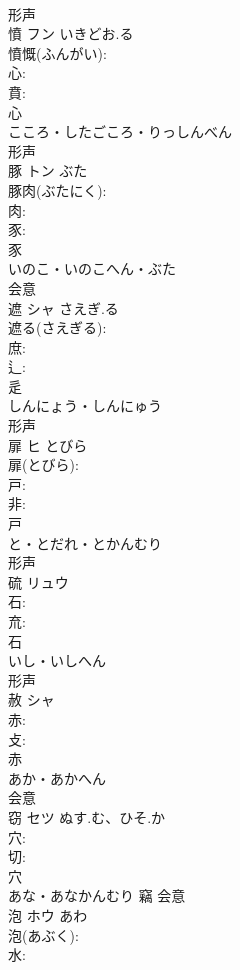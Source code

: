 \documentclass[8pt]{extreport}
\begin{document}
\begin{CJK}{UTF8}{min}
\\	形声 
\\	憤	フン	いきどお.る		
\\	憤慨(ふんがい): 
\\	心: 
\\	賁: 
\\	心	
\\	こころ・したごころ・りっしんべん	
\\	形声 
\\	豚	トン	ぶた		
\\	豚肉(ぶたにく): 
\\	肉: 
\\	豕: 
\\	豕	
\\	いのこ・いのこへん・ぶた	
\\	会意 
\\	遮	シャ	さえぎ.る		
\\	遮る(さえぎる): 
\\	庶: 
\\	辶: 
\\	辵	
\\	しんにょう・しんにゅう	
\\	形声 
\\	扉	ヒ	とびら		
\\	扉(とびら): 
\\	戸: 
\\	非: 
\\	戸	
\\	と・とだれ・とかんむり	
\\	形声 
\\	硫	リュウ			
\\	石: 
\\	㐬: 
\\	石	
\\	いし・いしへん	
\\	形声 
\\	赦	シャ			
\\	赤: 
\\	攴: 
\\	赤	
\\	あか・あかへん	
\\	会意 
\\	窃	セツ	ぬす.む、ひそ.か		
\\	穴: 
\\	切: 
\\	穴	
\\	あな・あなかんむり	竊	会意 
\\	泡	ホウ	あわ		
\\	泡(あぶく): 
\\	水: 

\end{CJK}
\end{document}
